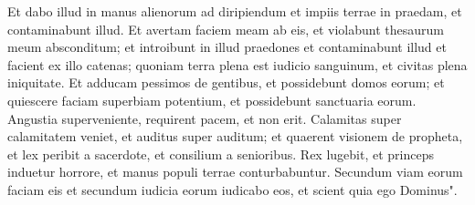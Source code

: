 \begin{biblechapter}
\verse Et dabo illud in manus alienorum ad diripiendum et impiis terrae in praedam, et contaminabunt illud. 
\verse Et avertam faciem meam ab eis, et violabunt thesaurum meum absconditum; et introibunt in illud praedones et contaminabunt illud 
\verse et facient ex illo catenas; quoniam terra plena est iudicio sanguinum, et civitas plena iniquitate. 
\verse Et adducam pessimos de gentibus, et possidebunt domos eorum; et quiescere faciam superbiam potentium, et possidebunt sanctuaria eorum. 
\verse Angustia superveniente, requirent pacem, et non erit. 
\verse Calamitas super calamitatem veniet, et auditus super auditum; et quaerent visionem de propheta, et lex peribit a sacerdote, et consilium a senioribus. 
\verse Rex lugebit, et princeps induetur horrore, et manus populi terrae conturbabuntur. Secundum viam eorum faciam eis et secundum iudicia eorum iudicabo eos, et scient quia ego Dominus". 
\end{biblechapter}


